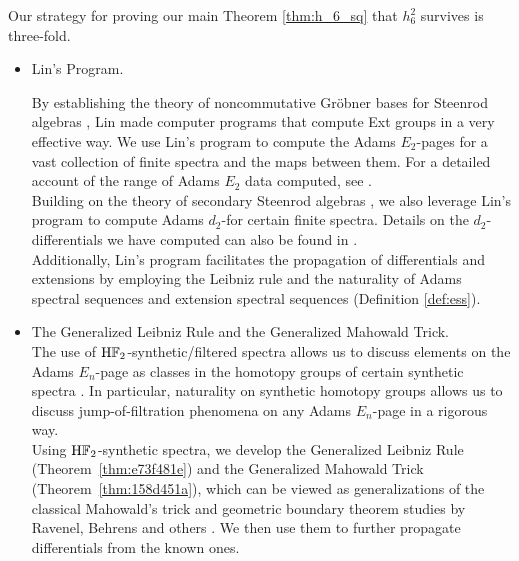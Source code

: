 \documentclass{amsart}
\numberwithin{equation}{section}
\newcommand{\HF}{\mathrm{H}\bF_2}
\begin{document}
Our strategy for proving our main Theorem \ref{thm:h_6_sq} that $h_6^2$ survives is three-fold. 

\begin{itemize}
    \item Lin's Program.

    \noindent By establishing the theory of noncommutative Gr\"obner bases for Steenrod algebras \cite{LinGrobner}, Lin made computer programs that compute Ext groups in a very effective way. We use Lin's program to compute the Adams $E_2$-pages for a vast collection of finite spectra and the maps between them. For a detailed account of the range of Adams $E_2$ data computed, see \cite{LWXMachine}.\\
    
    \noindent Building on the theory of secondary Steenrod algebras \cite{BJ, Nassau, Chua}, we also leverage Lin’s program to compute Adams $d_2$-for certain finite spectra. Details on the $d_2$-differentials we have computed can also be found in \cite{LWXMachine}.\\
    
    \noindent Additionally, Lin’s program facilitates the propagation of differentials and extensions by employing the Leibniz rule and the naturality of Adams spectral sequences and extension spectral sequences (Definition \ref{def:ess}). \\

    \item The Generalized Leibniz Rule and the Generalized Mahowald Trick. \\

    \noindent The use of $\HF$-synthetic/filtered spectra allows us to discuss elements on the Adams $E_n$-page as classes in the homotopy groups of certain synthetic spectra \cite{Pst, BurklundXu}. In particular, naturality on synthetic homotopy groups allows us to discuss jump-of-filtration phenomena on any Adams $E_n$-page in a rigorous way. \\
    
    \noindent Using $\HF$-synthetic spectra, we develop the Generalized Leibniz Rule (Theorem~\ref{thm:e73f481e}) and the Generalized Mahowald Trick (Theorem~\ref{thm:158d451a}), which can be viewed as generalizations of the classical Mahowald's trick and geometric boundary theorem studies by Ravenel, Behrens and others \cite{RavenelGreenbook, Behrens, Ma, BurklundCookware}. We then use them to further propagate differentials from the known ones.\\


\end{itemize}
\end{document}
